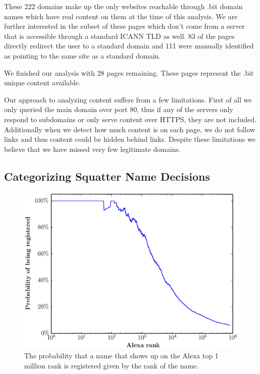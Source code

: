 These 222 domains make up the only websites reachable through .bit domain names which have real content on them at the time of this analysis. We are further interested in the subset of these pages which don't come from a server that is accessible through a standard ICANN TLD as well.  83 of the pages directly redirect the user to a standard domain and 111 were manually identified as pointing to the same site as a standard domain.

We finished our analysis with 28 pages remaining. These pages represent the .bit unique content available.

Our approach to analyzing content suffers from a few limitations. First of all we only queried the main domain over port 80, thus if any of the servers only respond to subdomains or only serve content over HTTPS, they are not included. Additionally when we detect how much content is on each page, we do not follow links and thus content could be hidden behind links. Despite these limitations we believe that we have missed very few legitimate domains.

\subsection{Categorizing Squatter Name Decisions}

\begin{figure}[t]
  \centering
  \includegraphics[width=\columnwidth]{figures/alexa_probability}
  \caption{The probability that a name that shows up on the Alexa top 1 million rank is registered given by the rank of the name.}
  \label{fig:alexa_probability}
\end{figure}

